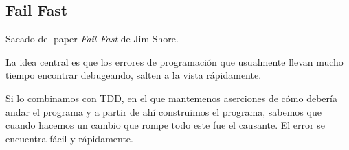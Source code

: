\subsection{Fail Fast}

Sacado del paper \emph{Fail Fast} de Jim Shore.

La idea central es que los errores de programaci\'on que usualmente llevan mucho tiempo encontrar debugeando, salten a la vista r\'apidamente. 

Si lo combinamos con TDD, en el que mantemenos aserciones de c\'omo deber\'ia andar el programa y a partir de ah\'i construimos el programa, sabemos que cuando hacemos un cambio que rompe todo este fue el causante. El error se encuentra f\'acil y r\'apidamente. 

